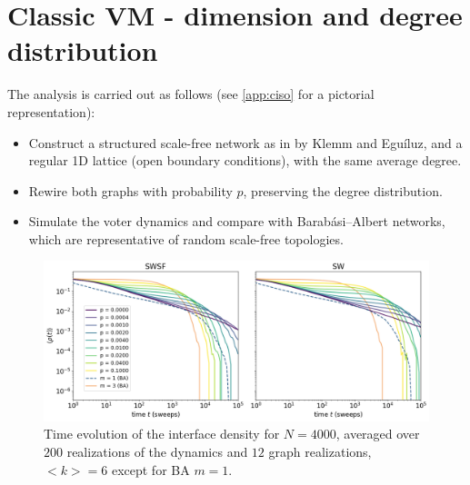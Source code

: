 \section{Classic VM - dimension and degree distribution}
The analysis is carried out as follows (see \autoref{app:ciso} for a pictorial representation):
\begin{itemize}
  \item Construct a structured scale-free network as in \cite{klemm2002highly} by Klemm and Eguíluz, and a regular 1D lattice (open boundary conditions), with the same average degree.
  \item Rewire both graphs with probability \(p\), preserving the degree distribution.
  \item Simulate the voter dynamics and compare with Barabási–Albert networks, which are representative of random scale-free topologies.
\end{itemize}


\begin{figure}[htbp]
  \centering
  \includegraphics[width=15.5cm,keepaspectratio]{images/SWSFvsSWvsBA_plot.png}
  \caption{Time evolution of the interface density for $N=4000$, averaged over $200$ realizations of the dynamics and $12$ graph realizations, $<k> = 6$ except for BA $m=1$.}
  \label{fig:votercomparison}
\end{figure}

